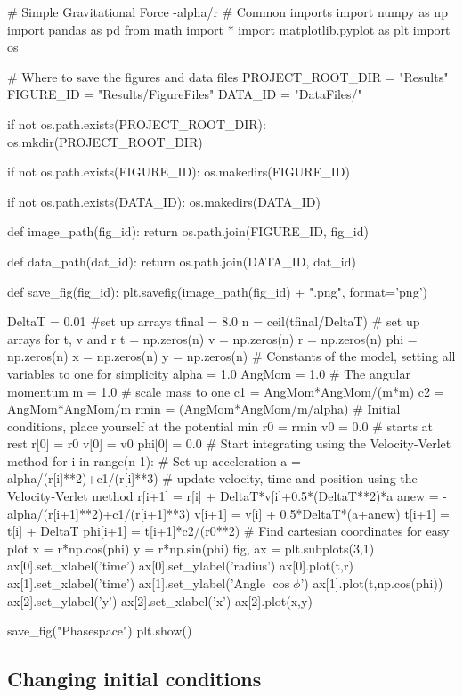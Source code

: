 \documentclass[%
oneside,                 %
final,                   %
10pt]{article}
\begin{document}
\bpycod

# Simple Gravitational Force   -alpha/r
# Common imports
import numpy as np
import pandas as pd
from math import *
import matplotlib.pyplot as plt
import os

# Where to save the figures and data files
PROJECT_ROOT_DIR = "Results"
FIGURE_ID = "Results/FigureFiles"
DATA_ID = "DataFiles/"

if not os.path.exists(PROJECT_ROOT_DIR):
    os.mkdir(PROJECT_ROOT_DIR)

if not os.path.exists(FIGURE_ID):
    os.makedirs(FIGURE_ID)

if not os.path.exists(DATA_ID):
    os.makedirs(DATA_ID)

def image_path(fig_id):
    return os.path.join(FIGURE_ID, fig_id)

def data_path(dat_id):
    return os.path.join(DATA_ID, dat_id)

def save_fig(fig_id):
    plt.savefig(image_path(fig_id) + ".png", format='png')


    
DeltaT = 0.01
#set up arrays 
tfinal = 8.0
n = ceil(tfinal/DeltaT)
# set up arrays for t, v and r
t = np.zeros(n)
v = np.zeros(n)
r = np.zeros(n)
phi = np.zeros(n)
x = np.zeros(n)
y = np.zeros(n)
# Constants of the model, setting all variables to one for simplicity
alpha = 1.0
AngMom = 1.0  #  The angular momentum
m = 1.0  # scale mass to one
c1 = AngMom*AngMom/(m*m)
c2 = AngMom*AngMom/m
rmin = (AngMom*AngMom/m/alpha)
# Initial conditions, place yourself at the potential min
r0 = rmin
v0 = 0.0  # starts at rest
r[0] = r0
v[0] = v0
phi[0] = 0.0
# Start integrating using the Velocity-Verlet  method
for i in range(n-1):
    # Set up acceleration
    a = -alpha/(r[i]**2)+c1/(r[i]**3)
    # update velocity, time and position using the Velocity-Verlet method
    r[i+1] = r[i] + DeltaT*v[i]+0.5*(DeltaT**2)*a
    anew = -alpha/(r[i+1]**2)+c1/(r[i+1]**3)
    v[i+1] = v[i] + 0.5*DeltaT*(a+anew)
    t[i+1] = t[i] + DeltaT
    phi[i+1] = t[i+1]*c2/(r0**2)
# Find cartesian coordinates for easy plot    
x = r*np.cos(phi)
y = r*np.sin(phi)
fig, ax = plt.subplots(3,1)
ax[0].set_xlabel('time')
ax[0].set_ylabel('radius')
ax[0].plot(t,r)
ax[1].set_xlabel('time')
ax[1].set_ylabel('Angle $\cos{\phi}$')
ax[1].plot(t,np.cos(phi))
ax[2].set_ylabel('y')
ax[2].set_xlabel('x')
ax[2].plot(x,y)

save_fig("Phasespace")
plt.show()


\epycod


\subsection{Changing initial conditions}
\end{document}
